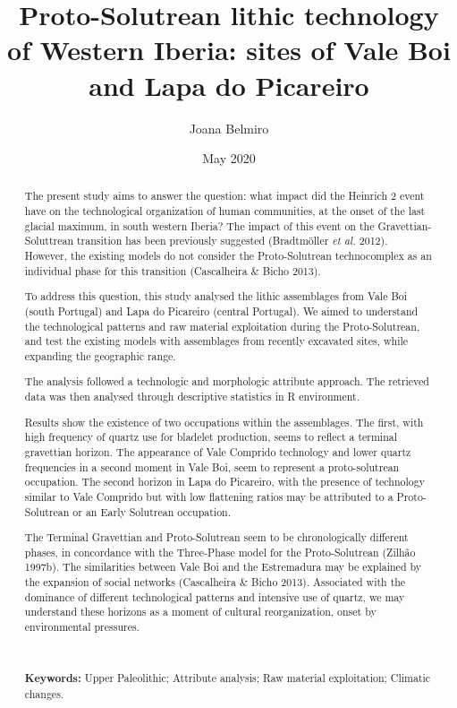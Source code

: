 \documentclass[12pt,twoside]{reedthesis}
\title{Proto-Solutrean lithic technology of Western Iberia: sites of Vale Boi and Lapa do Picareiro}
\author{Joana Belmiro}
\date{May 2020}
\begin{document}
  \maketitle

\frontmatter %


  \begin{abstract}
    The present study aims to answer the question: what impact did the Heinrich 2 event have on the technological organization of human communities, at the onset of the last glacial maximum, in south western Iberia? The impact of this event on the Gravettian-Soluttrean transition has been previously suggested (Bradtmöller \emph{et al.} 2012). However, the existing models do not consider the Proto-Solutrean technocomplex as an individual phase for this transition (Cascalheira \& Bicho 2013).
    
    \par
    
    To address this question, this study analysed the lithic assemblages from Vale Boi (south Portugal) and Lapa do Picareiro (central Portugal). We aimed to understand the technological patterns and raw material exploitation during the Proto-Solutrean, and test the existing models with assemblages from recently excavated sites, while expanding the geographic range.
    
    The analysis followed a technologic and morphologic attribute approach. The retrieved data was then analysed through descriptive statistics in R environment.
    
    Results show the existence of two occupations within the assemblages. The first, with high frequency of quartz use for bladelet production, seems to reflect a terminal gravettian horizon. The appearance of Vale Comprido technology and lower quartz frequencies in a second moment in Vale Boi, seem to represent a proto-solutrean occupation. The second horizon in Lapa do Picareiro, with the presence of technology similar to Vale Comprido but with low flattening ratios may be attributed to a Proto-Solutrean or an Early Solutrean occupation.
    
    The Terminal Gravettian and Proto-Solutrean seem to be chronologically different phases, in concordance with the Three-Phase model for the Proto-Solutrean (Zilhão 1997b). The similarities between Vale Boi and the Estremadura may be explained by the expansion of social networks (Cascalheira \& Bicho 2013). Associated with the dominance of different technological patterns and intensive use of quartz, we may understand these horizons as a moment of cultural reorganization, onset by environmental pressures.
    
    ~
    
    \textbf{Keywords:} Upper Paleolithic; Attribute analysis; Raw material exploitation; Climatic changes.
  \end{abstract}
\end{document}
